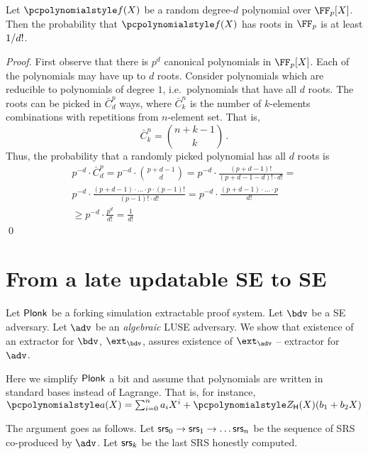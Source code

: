 \documentclass[runningheads,11pt]{llncs}
\begin{document}
\begin{lemma}
  \label{lem:root_prob}
  Let $\p{f}(X)$ be a random degree-$d$ polynomial over $\FF_p[X]$. Then the
  probability that $\p{f}(X)$ has roots in $\FF_p$ is at least $1 / d!$.
\end{lemma}
\begin{proof}
  First observe that there is $p^{d}$ canonical polynomials in $\FF_p[X]$.  Each
  of the polynomials may have up to $d$ roots. Consider polynomials which are
  reducible to polynomials of degree $1$, i.e.~polynomials that have all $d$
  roots. The roots can be picked in $\bar{C}^{p}_{d}$ ways, where
  $\bar{C}^{n}_{k}$ is the number of $k$-elements combinations with repetitions
  from $n$-element set. That is,
  \[
    \bar{C}^n_k = \binom{n + k - 1}{k}\,.
  \]
  Thus, the probability that a randomly picked polynomial has all $d$ roots is
  \begin{multline*}
    p^{-d} \cdot \bar{C}^p_d = p^{-d} \cdot \binom{p + d - 1}{d} =
    p^{-d} \cdot \frac{(p + d - 1)!}{(p + d - 1 - d)! \cdot d!} = \\
    p^{-d} \cdot \frac{(p + d - 1) \cdot \ldots \cdot p \cdot (p - 1)!}{(p - 1)!
      \cdot d!} = p^{-d} \cdot \frac{(p + d - 1)\cdot
      \ldots \cdot p}{d!} \\
    \geq p^{-d} \cdot {\frac{p^d}{d!}} = \frac{1}{d!}
  \end{multline*}
  \qed
\end{proof}



\section{From a late updatable SE to SE}

Let $\textnormal{\textsf{Plonk}}$ be a forking simulation extractable proof system. Let $\bdv$ be a
SE adversary. Let $\adv$ be an \emph{algebraic} LUSE adversary. We show that existence of an
extractor for $\bdv$, $\ext_\bdv$, assures existence of $\ext_\adv$ -- extractor
for $\adv$.

Here we simplify $\textnormal{\textsf{Plonk}}$ a bit and assume that polynomials are written in
standard bases instead of Lagrange. That is, for instance, $\p{a} (X) = \sum_{i
  = 0}^n a_i X^i + \ZERO_\HHH (X) (b_1 + b_2 X)$
 
The argument goes as follows.  Let $\mathsf{srs}_0 \to \mathsf{srs}_1 \to \ldots \mathsf{srs}_n$ be the
sequence of SRS co-produced by $\adv$. Let $\mathsf{srs}_k$ be the last SRS
honestly computed.
\end{document}
